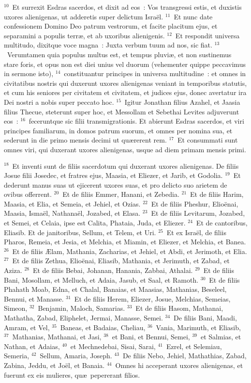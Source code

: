 ${}^{10}$~Et surrexit Esdras sacerdos, et dixit ad eos~: Vos transgressi estis, et duxistis uxores alienigenas, ut adderetis super delictum Isra\"el.
${}^{11}$~Et nunc date confessionem Domino Deo patrum vestrorum, et facite placitum ejus, et separamini a populis terr\ae , et ab uxoribus alienigenis.
${}^{12}$~Et respondit universa multitudo, dixitque voce magna~: Juxta verbum tuum ad nos, sic fiat.
${}^{13}$~Verumtamen quia populus multus est, et tempus pluvi\ae , et non sustinemus stare foris, et opus non est diei unius vel duorum (vehementer quippe peccavimus in sermone isto),
${}^{14}$~constituantur principes in universa multitudine~: et omnes in civitatibus nostris qui duxerunt uxores alienigenas veniant in temporibus statutis, et cum his seniores per civitatem et civitatem, et judices ejus, donec avertatur ira Dei nostri a nobis super peccato hoc.
${}^{15}$~Igitur Jonathan filius Azahel, et Jaasia filius Thecue, steterunt super hoc, et Messollam et Sebethai Levites adjuverunt eos~:
${}^{16}$~feceruntque sic filii transmigrationis. Et abierunt Esdras sacerdos, et viri principes familiarum, in domos patrum suorum, et omnes per nomina sua, et sederunt in die primo mensis decimi ut qu\ae rerent rem.
${}^{17}$~Et consummati sunt omnes viri, qui duxerant uxores alienigenas, usque ad diem primam mensis primi.


${}^{18}$~Et inventi sunt de filiis sacerdotum qui duxerant uxores alienigenas. De filiis Josue filii Josedec, et fratres ejus, Maasia, et Eliezer, et Jarib, et Godolia.
${}^{19}$~Et dederunt manus suas ut ejicerent uxores suas, et pro delicto suo arietem de ovibus offerrent.
${}^{20}$~Et de filiis Emmer, Hanani, et Zebedia.
${}^{21}$~Et de filiis Harim, Maasia, et Elia, et Semeia, et Jehiel, et Ozias.
${}^{22}$~Et de filiis Pheshur, Elio\"enai, Maasia, Isma\"el, Nathana\"el, Jozabed, et Elasa.
${}^{23}$~Et de filiis Levitarum, Jozabed, et Semei, et Celaia, ipse est Calita, Phataia, Juda, et Eliezer.
${}^{24}$~Et de cantoribus, Eliasib. Et de janitoribus, Sellum, et Telem, et Uri.
${}^{25}$~Et ex Isra\"el, de filiis Pharos, Remeia, et Jesia, et Melchia, et Miamin, et Eliezer, et Melchia, et Banea.
${}^{26}$~Et de filiis \AE lam, Mathania, Zacharias, et Jehiel, et Abdi, et Jerimoth, et Elia.
${}^{27}$~Et de filiis Zethua, Elio\"enai, Eliasib, Mathania, et Jerimuth, et Zabad, et Aziza.
${}^{28}$~Et de filiis Bebai, Johanan, Hanania, Zabbai, Athalai.
${}^{29}$~Et de filiis Bani, Mosollam, et Melluch, et Adaia, Jasub, et Saal, et Ramoth.
${}^{30}$~Et de filiis Phahath Moab, Edna, et Chalal, Banaias, et Maasias, Mathanias, Beseleel, Bennui, et Manasse.
${}^{31}$~Et de filiis Herem, Eliezer, Josue, Melchias, Semeias, Simeon,
${}^{32}$~Benjamin, Maloch, Samarias.
${}^{33}$~Et de filiis Hasom, Mathanai, Mathatha, Zabad, Eliphelet, Jermai, Manasse, Semei.
${}^{34}$~De filiis Bani, Maadi, Amram, et Vel,
${}^{35}$~Baneas, et Badaias, Cheliau,
${}^{36}$~Vania, Marimuth, et Eliasib,
${}^{37}$~Mathanias, Mathanai, et Jasi,
${}^{38}$~et Bani, et Bennui, Semei,
${}^{39}$~et Salmias, et Nathan, et Adaias,
${}^{40}$~et Mechnedebai, Sisai, Sarai,
${}^{41}$~Ezrel, et Selemiau, Semeria,
${}^{42}$~Sellum, Amaria, Joseph.
${}^{43}$~De filiis Nebo, Jehiel, Mathathias, Zabad, Zabina, Jeddu, et Jo\"el, et Banaia.
${}^{44}$~Omnes hi acceperant uxores alienigenas, et fuerunt ex eis mulieres, qu\ae\ pepererant filios.
